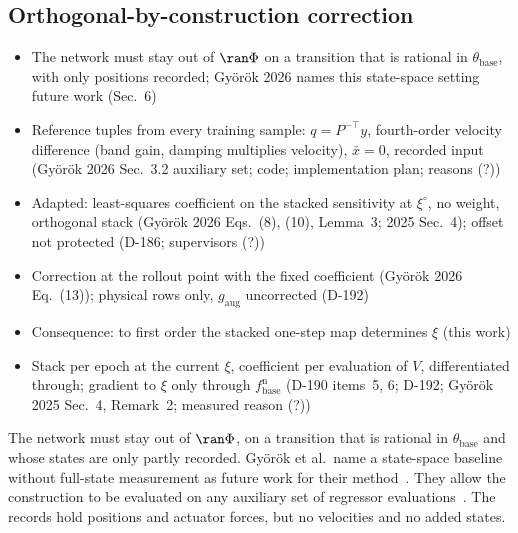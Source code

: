 \subsection{Orthogonal-by-construction correction}\label{sec:obc_map}
\ifdraft
\begin{itemize}
\item The network must stay out of $\ran\Phi$ on a transition that is rational in $\theta_{\mathrm{base}}$, with only positions recorded; Gy\"or\"ok 2026 names this state-space setting future work (Sec.~6)
\item Reference tuples from every training sample: $q=P^{-\top}y$, fourth-order velocity difference (band gain, damping multiplies velocity), $\bar x=0$, recorded input (Gy\"or\"ok 2026 Sec.~3.2 auxiliary set; code; implementation plan; reasons (?))
\item Adapted: least-squares coefficient on the stacked sensitivity at $\xi^\circ$, no weight, orthogonal stack (Gy\"or\"ok 2026 Eqs.~(8), (10), Lemma~3; 2025 Sec.~4); offset not protected (D-186; supervisors (?))
\item Correction at the rollout point with the fixed coefficient (Gy\"or\"ok 2026 Eq.~(13)); physical rows only, $g_{\mathrm{aug}}$ uncorrected (D-192)
\item Consequence: to first order the stacked one-step map determines $\xi$ (this work)
\item Stack per epoch at the current $\xi$, coefficient per evaluation of $V$, differentiated through; gradient to $\xi$ only through $f^{\mathrm n}_{\mathrm{base}}$ (D-190 items~5, 6; D-192; Gy\"or\"ok 2025 Sec.~4, Remark~2; measured reason (?))
\end{itemize}
\fi

The network must stay out of $\ran\Phi$, on a transition that is rational in
$\theta_{\mathrm{base}}$ and whose states are only partly recorded.
Gy\"or\"ok et al.\ name a state-space baseline without full-state
measurement as future work for their method~\cite[Sec.~6]{gyorok2026obc}.
They allow the construction to be evaluated on any auxiliary set of
regressor evaluations~\cite[Sec.~3.2]{gyorok2026obc}.
The records hold positions and actuator forces, but no velocities and no
added states.

